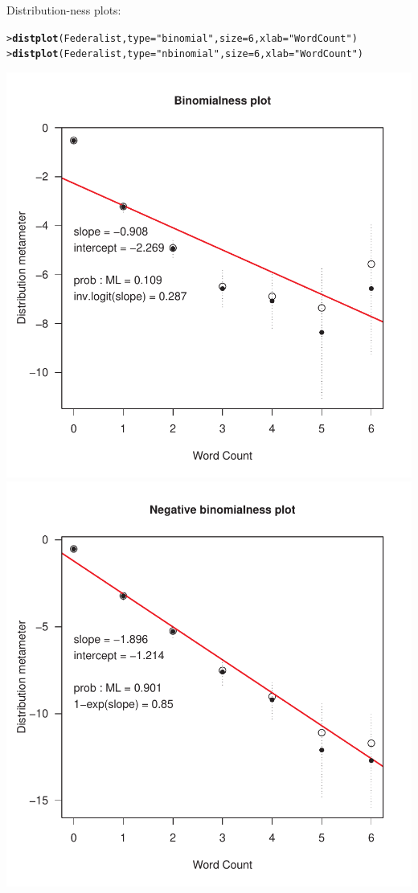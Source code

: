 \documentclass[10pt]{report}\usepackage[]{graphicx}\usepackage[]{color}
\makeatletter
\newcommand{\hlnum}[1]{\textcolor[rgb]{0.686,0.059,0.569}{#1}}%
\newcommand{\hlstr}[1]{\textcolor[rgb]{0.192,0.494,0.8}{#1}}%
\newcommand{\hlstd}[1]{\textcolor[rgb]{0.345,0.345,0.345}{#1}}%
\newcommand{\hlkwc}[1]{\textcolor[rgb]{0.333,0.667,0.333}{#1}}%
\newcommand{\hlkwd}[1]{\textcolor[rgb]{0.737,0.353,0.396}{\textbf{#1}}}%
\newenvironment{kframe}{%
 \def\at@end@of@kframe{}%
 \ifinner\ifhmode%
  \def\at@end@of@kframe{\end{minipage}}%
  \begin{minipage}{\columnwidth}%
 \fi\fi%
 \def\FrameCommand##1{\hskip\@totalleftmargin \hskip-\fboxsep
 \colorbox{shadecolor}{##1}\hskip-\fboxsep
     \hskip-\linewidth \hskip-\@totalleftmargin \hskip\columnwidth}%
 \MakeFramed {\advance\hsize-\width
   \@totalleftmargin\z@ \linewidth\hsize
   \@setminipage}}%
 {\par\unskip\endMakeFramed%
 \at@end@of@kframe}
\newenvironment{knitrout}{}{} %
\renewenvironment{knitrout}{\small\renewcommand{\baselinestretch}{.85}}{} %
\makeatother
\begin{document}
\begin{Exercises}
\begin{enumerate*}
\begin{ans}
\begin{knitrout}
\end{knitrout}
    Distribution-ness plots:
\begin{knitrout}\footnotesize
{}\color{fgcolor}\begin{kframe}
\begin{alltt}
\hlstd{> }\hlkwd{distplot}\hlstd{(Federalist,} \hlkwc{type} \hlstd{=} \hlstr{"binomial"}\hlstd{,} \hlkwc{size}\hlstd{=}\hlnum{6}\hlstd{,} \hlkwc{xlab} \hlstd{=} \hlstr{"Word Count"}\hlstd{)}
\hlstd{> }\hlkwd{distplot}\hlstd{(Federalist,} \hlkwc{type} \hlstd{=} \hlstr{"nbinomial"}\hlstd{,} \hlkwc{size}\hlstd{=}\hlnum{6}\hlstd{,} \hlkwc{xlab} \hlstd{=} \hlstr{"Word Count"}\hlstd{)}
\end{alltt}
\end{kframe}

\centerline{\includegraphics[width=.49\textwidth]{soln/fig/ex3_5c2-1} 
\includegraphics[width=.49\textwidth]{soln/fig/ex3_5c2-2} }



\end{knitrout}
    \end{ans}
    
  \end{enumerate*}


\end{Exercises}
\end{document}
